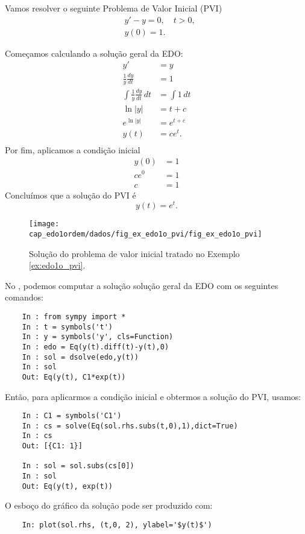 \begin{ex}\label{ex:edo1o_pvi}
  Vamos resolver o seguinte Problema de Valor Inicial (PVI)
  \begin{align}
    &y' - y = 0, \quad t>0,\\
    &y(0) = 1.
  \end{align}
  
  Começamos calculando a solução geral da EDO:
  \begin{align}
    y' &= y\\
    \frac{1}{y}\frac{dy}{dt} &= 1 \\
    \int \frac{1}{y}\frac{dy}{dt}\,dt &= \int 1\,dt \\
    \ln|y| &= t + c \\
    e^{\ln|y|} &= e^{t+c}\\
    y(t) &= ce^{t}.\\
  \end{align}
  Por fim, aplicamos a condição inicial
  \begin{align}
    y(0) &= 1 \\
    ce^{0} &= 1 \\
    c &= 1
  \end{align}
  Concluímos que a solução do PVI é
  \begin{equation}
    y(t) = e^{t}.
  \end{equation}

  \begin{figure}[H]
    \centering
    \texttt{[image: cap\_edo1ordem/dados/fig\_ex\_edo1o\_pvi/fig\_ex\_edo1o\_pvi]}
    \caption{Solução do problema de valor inicial tratado no Exemplo \ref{ex:edo1o_pvi}.}
    \label{fig:ex_edo1o_pvi}
  \end{figure}

  \ifispython
  No \python, podemos computar a solução solução geral da EDO com os seguintes comandos:
  \begin{lstlisting}
    In : from sympy import *
    In : t = symbols('t')
    In : y = symbols('y', cls=Function)
    In : edo = Eq(y(t).diff(t)-y(t),0)
    In : sol = dsolve(edo,y(t))
    In : sol
    Out: Eq(y(t), C1*exp(t))
  \end{lstlisting}
  Então, para aplicarmos a condição inicial e obtermos a solução do PVI, usamos:
  \begin{lstlisting}
    In : C1 = symbols('C1')
    In : cs = solve(Eq(sol.rhs.subs(t,0),1),dict=True)
    In : cs
    Out: [{C1: 1}]
    
    In : sol = sol.subs(cs[0])
    In : sol
    Out: Eq(y(t), exp(t))
  \end{lstlisting}
  O esboço do gráfico da solução pode ser produzido com:
  \begin{lstlisting}
    In: plot(sol.rhs, (t,0, 2), ylabel='$y(t)$')
  \end{lstlisting}
  \fi
\end{ex}

